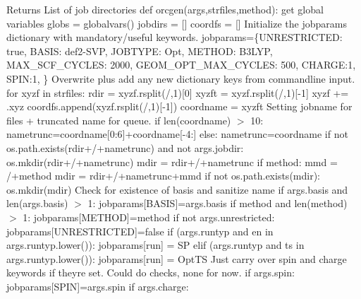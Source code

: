\begin{DoxyReturn}{Returns}
List of job directories def orcgen(args,strfiles,method)\+: get global variables globs = globalvars() jobdirs = \mbox{[}\mbox{]} coordfs = \mbox{[}\mbox{]} Initialize the jobparams dictionary with mandatory/useful keywords. jobparams=\{\textquotesingle{}U\+N\+R\+E\+S\+T\+R\+I\+C\+T\+ED\textquotesingle{}\+: \textquotesingle{}true\textquotesingle{}, \textquotesingle{}B\+A\+S\+IS\textquotesingle{}\+: \textquotesingle{}def2-\/\+S\+VP\textquotesingle{}, \textquotesingle{}J\+O\+B\+T\+Y\+PE\textquotesingle{}\+: \textquotesingle{}Opt\textquotesingle{}, \textquotesingle{}M\+E\+T\+H\+OD\textquotesingle{}\+: \textquotesingle{}B3\+L\+YP\textquotesingle{}, \textquotesingle{}M\+A\+X\+\_\+\+S\+C\+F\+\_\+\+C\+Y\+C\+L\+ES\textquotesingle{}\+: \textquotesingle{}2000\textquotesingle{}, \textquotesingle{}G\+E\+O\+M\+\_\+\+O\+P\+T\+\_\+\+M\+A\+X\+\_\+\+C\+Y\+C\+L\+ES\textquotesingle{}\+: \textquotesingle{}500\textquotesingle{}, \textquotesingle{}C\+H\+A\+R\+GE\textquotesingle{}\+:\textquotesingle{}1\textquotesingle{}, \textquotesingle{}S\+P\+IN\textquotesingle{}\+:\textquotesingle{}1\textquotesingle{}, \} Overwrite plus add any new dictionary keys from commandline input. for xyzf in strfiles\+: rdir = xyzf.\+rsplit(\textquotesingle{}/\textquotesingle{},1)\mbox{[}0\mbox{]} xyzft = xyzf.\+rsplit(\textquotesingle{}/\textquotesingle{},1)\mbox{[}-\/1\mbox{]} xyzf += \textquotesingle{}.xyz\textquotesingle{} coordfs.\+append(xyzf.\+rsplit(\textquotesingle{}/\textquotesingle{},1)\mbox{[}-\/1\mbox{]}) coordname = xyzft Setting jobname for files + truncated name for queue. if len(coordname) $>$ 10\+: nametrunc=coordname\mbox{[}0\+:6\mbox{]}+coordname\mbox{[}-\/4\+:\mbox{]} else\+: nametrunc=coordname if not os.\+path.\+exists(rdir+\textquotesingle{}/\textquotesingle{}+nametrunc) and not args.\+jobdir\+: os.\+mkdir(rdir+\textquotesingle{}/\textquotesingle{}+nametrunc) mdir = rdir+\textquotesingle{}/\textquotesingle{}+nametrunc if method\+: mmd = \textquotesingle{}/\textquotesingle{}+method mdir = rdir+\textquotesingle{}/\textquotesingle{}+nametrunc+mmd if not os.\+path.\+exists(mdir)\+: os.\+mkdir(mdir) Check for existence of basis and sanitize name if args.\+basis and len(args.\+basis) $>$ 1\+: jobparams\mbox{[}\textquotesingle{}B\+A\+S\+IS\textquotesingle{}\mbox{]}=args.\+basis if method and len(method) $>$ 1\+: jobparams\mbox{[}\textquotesingle{}M\+E\+T\+H\+OD\textquotesingle{}\mbox{]}=method if not args.\+unrestricted\+: jobparams\mbox{[}\textquotesingle{}U\+N\+R\+E\+S\+T\+R\+I\+C\+T\+ED\textquotesingle{}\mbox{]}=\textquotesingle{}false\textquotesingle{} if (args.\+runtyp and \textquotesingle{}en\textquotesingle{} in args.\+runtyp.\+lower())\+: jobparams\mbox{[}\textquotesingle{}run\textquotesingle{}\mbox{]} = \textquotesingle{}SP\textquotesingle{} elif (args.\+runtyp and \textquotesingle{}ts\textquotesingle{} in args.\+runtyp.\+lower())\+: jobparams\mbox{[}\textquotesingle{}run\textquotesingle{}\mbox{]} = \textquotesingle{}Opt\+TS\textquotesingle{} Just carry over spin and charge keywords if they\textquotesingle{}re set. Could do checks, none for now. if args.\+spin\+: jobparams\mbox{[}\textquotesingle{}S\+P\+IN\textquotesingle{}\mbox{]}=args.\+spin if args.\+charge\+: 
\end{DoxyReturn}
